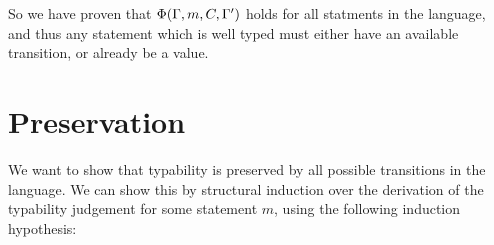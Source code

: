 \documentclass[a4paper]{article}
\theoremstyle{dotless}
\theoremstyle{case}
\theoremstyle{subcase}
\begin{document}
%				
%
%
%
%
%
%
%
%
	
	So we have proven that $\Phi(\Gamma, m, C, \Gamma')$ holds for all statments in the language,
	and thus any statement which is well typed must either have an available
	transition, or already be a value.


\section*{Preservation}
	
	We want to show that typability is preserved by all possible transitions
	in the language. We can show this by structural induction over the
	derivation of the typability judgement for some statement $m$, using the
	following induction hypothesis:

	
\end{document}
